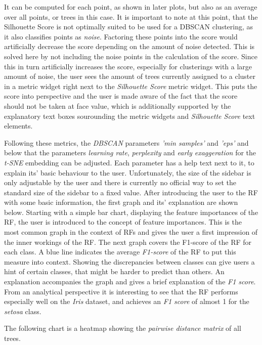 \documentclass[a4paper, 12pt]{article}
\begin{document}
It can be computed for each point, as shown in later plots, but also as an average over all points, or
trees in this case. It is important to note at this point, that the Silhouette Score is not optimally
suited to be used for a DBSCAN clustering, as it also classifies points as \textit{noise}. Factoring
these points into the score would artificially decrease the score depending on the amount of noise
detected. This is solved here by not including the noise points in the calculation of the score.
Since this in turn artificially increases the score, especially for clusterings with a large amount of
noise, the user sees the amount of trees currently assigned to a cluster in a metric widget right next
to the \textit{Silhouette Score} metric widget. This puts the score into perspective and the user is
made aware of the fact that the score should not be taken at face value, which is additionally supported
by the explanatory text boxes sourounding the metric widgets and \textit{Silhouette Score} text elements.
\par
Following these metrics, the
\textit{DBSCAN} parameters \textit{'min samples'} and \textit{'eps'} and below that
the parameters \textit{learning rate}, \textit{perplexity} and \textit{early exaggeration} for the
\textit{t-SNE} embedding can be adjusted.
Each parameter has a help text next to it, to explain its' basic behaviour to the user.
Unfortunately, the size of the sidebar is only adjustable by the user and there is currently no
official way to set the standard size of the sidebar to a fixed value.
After introducing the user to the RF with some basic information, the first graph and its' explanation
are shown below. Starting with a simple bar chart, displaying the feature importances of the RF,
the user is introduced to the concept of feature importances. This is the most common graph in the
context of RFs and gives the user a first impression of the inner workings of the RF. The next graph
covers the F1-score of the RF for each class. A blue line indicates the average \textit{F1-score} of the RF to
put this measure into context. Showing the discrepancies between classes can give users a hint of
certain classes, that might be harder to predict than others. An explanation accompanies the graph
and gives a brief explanation of the \textit{F1 score}.
From an analytical perspective it is interesting to see that the RF performs especially well on the
\textit{Iris} dataset, and achieves an \textit{F1 score} of almost 1 for the \textit{setosa} class.
\par
The following chart is a heatmap showing the \textit{pairwise distance matrix} of all trees.
\end{document}
